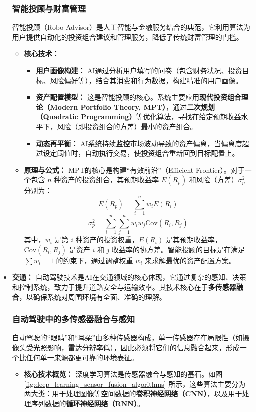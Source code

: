 \begin{itemize}
    \subsubsection{智能投顾与财富管理}
    智能投顾（Robo-Advisor）是人工智能与金融服务结合的典范，它利用算法为用户提供自动化的投资组合建议和管理服务，降低了传统财富管理的门槛。
    \begin{itemize}
        \item \textbf{核心技术：}
            \begin{itemize}
                \item \textbf{用户画像构建：} AI通过分析用户填写的问卷（包含财务状况、投资目标、风险偏好等），结合其消费和行为数据，构建精准的用户画像。
                \item \textbf{资产配置模型：} 这是智能投顾的核心。系统主要应用\textbf{现代投资组合理论（Modern Portfolio Theory, MPT）}，通过\textbf{二次规划（Quadratic Programming）}等优化算法，寻找在给定预期收益水平下，风险（即投资组合的方差）最小的资产组合。
                \item \textbf{动态再平衡：} AI系统持续监控市场波动导致的资产偏离，当偏离度超过设定阈值时，自动执行交易，使投资组合重新回到目标配置上。
            \end{itemize}
        \item \textbf{原理与公式：} MPT的核心是构建“有效前沿”（Efficient Frontier）。对于一个包含 $n$ 种资产的投资组合，其预期收益率 $E(R_p)$ 和风险（方差）$\sigma_p^2$ 分别为：
        $$ E(R_p) = \sum_{i=1}^{n} w_i E(R_i) $$
        $$ \sigma_p^2 = \sum_{i=1}^{n} \sum_{j=1}^{n} w_i w_j \text{Cov}(R_i, R_j) $$
        其中，$w_i$ 是第 $i$ 种资产的投资权重，$E(R_i)$ 是其预期收益率，$\text{Cov}(R_i, R_j)$ 是资产 $i$ 和 $j$ 收益率的协方差。智能投顾的目标是在满足 $\sum w_i = 1$ 的约束下，通过调整权重 $w_i$ 来求解最优的资产配置方案。
    \end{itemize}
    
    \item \textbf{交通：} 自动驾驶技术是AI在交通领域的核心体现，它通过复杂的感知、决策和控制系统，致力于提升道路安全与运输效率。其技术核心在于\textbf{多传感器融合}，以确保系统对周围环境有全面、准确的理解。
    
    \subsubsection{自动驾驶中的多传感器融合与感知}
    自动驾驶的“眼睛”和“耳朵”由多种传感器构成，单一传感器存在局限性（如摄像头受光照影响，雷达分辨率低），因此必须将它们的信息融合起来，形成一个比任何单一来源都更可靠的环境表征。
    \begin{itemize}
        \item \textbf{核心技术概览：} 深度学习算法是传感器融合与感知的基石。如图 \ref{fig:deep_learning_sensor_fusion_algorithms} 所示，这些算法主要分为两大类：用于处理图像等空间数据的\textbf{卷积神经网络（CNN）}，以及用于处理序列数据的\textbf{循环神经网络（RNN）}。
        

\end{itemize}
\end{itemize}
